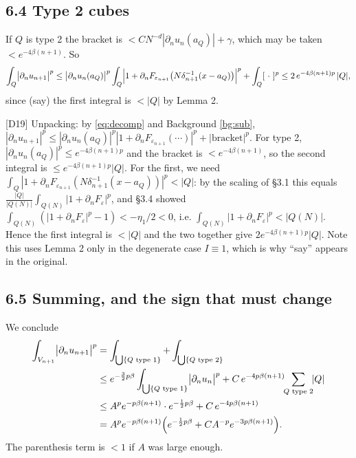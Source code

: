 \documentclass[11pt,reqno]{amsart}
\theoremstyle{plain}
\theoremstyle{definition}
\theoremstyle{plain}
\theoremstyle{definition}
\theoremstyle{remark}
\newcommand{\nd}{\partial_n}
\newcommand{\Ledger}[1]{{\scriptsize\textsf{[#1]}}}
\begin{document}
\subsection*{6.4 Type 2 cubes}

If $Q$ is type 2 the bracket is $<CN^{-d}|\nd u_n(a_Q)|+\gamma$, which may be taken
$<e^{-4\beta(n+1)}$. So
\begin{equation}\label{eq:type2}
 \int_Q\bigl|\nd u_{n+1}\bigr|^p
 \le\bigl|\nd u_{n}(a_Q)\bigr|^p
   \int_Q\Bigl|1+\nd F_{\varepsilon_{n+1}}\bigl(N\delta_{n+1}^{-1}(x-a_Q)\bigr)
   \Bigr|^p+\int_Q[\ \cdot\ ]^p
 \le2\,e^{-4\beta(n+1)p}\,|Q|,
\end{equation}
since (say) the first integral is $<|Q|$ by Lemma 2.

\begin{expansion}
\Ledger{D19} Unpacking: by \eqref{eq:decomp} and Background \ref{bg:sub},
$|\nd u_{n+1}|^p\le|\nd u_n(a_Q)|^p|1+\nd F_{\varepsilon_{n+1}}(\cdots)|^p
 +|\text{bracket}|^p$. For type 2, $|\nd u_n(a_Q)|^p\le e^{-4\beta(n+1)p}$ and the
bracket is $<e^{-4\beta(n+1)}$, so the second integral is
$\le e^{-4\beta(n+1)p}|Q|$. For the first, we need
$\int_Q|1+\nd F_{\varepsilon_{n+1}}(N\delta_{n+1}^{-1}(x-a_Q))|^p<|Q|$: by the
scaling of \S3.1 this equals $\frac{|Q|}{|Q(N)|}\int_{Q(N)}|1+\nd F_\varepsilon|^p$,
and \S3.4 showed $\int_{Q(N)}(|1+\nd F_\varepsilon|^p-1)<-\eta_1/2<0$, i.e.
$\int_{Q(N)}|1+\nd F_\varepsilon|^p<|Q(N)|$. Hence the first integral is $<|Q|$ and
the two together give $2e^{-4\beta(n+1)p}|Q|$. Note this uses Lemma 2 only in the
degenerate case $I\equiv1$, which is why ``say'' appears in the original.
\end{expansion}

\subsection*{6.5 Summing, and the sign that must change}

We conclude
\begin{align}
 \int_{V_{n+1}}\bigl|\nd u_{n+1}\bigr|^p
 &=\int_{\bigcup\{Q\text{ type }1\}}+\int_{\bigcup\{Q\text{ type }2\}}\notag\\
 &\le e^{-\frac32p\beta}\int_{\bigcup\{Q\text{ type }1\}}\bigl|\nd u_n\bigr|^p
   +C\,e^{-4p\beta(n+1)}\!\!\sum_{Q\text{ type }2}\!\!|Q|\notag\\
 &\le A^pe^{-p\beta(n+1)}\cdot e^{-\frac12p\beta}+C\,e^{-4p\beta(n+1)}\notag\\
 &=A^pe^{-p\beta(n+1)}\Bigl(e^{-\frac12p\beta}+CA^{-p}e^{-3p\beta(n+1)}\Bigr).
 \label{eq:final}
\end{align}
The parenthesis term is $<1$ if $A$ was large enough.
\end{document}
